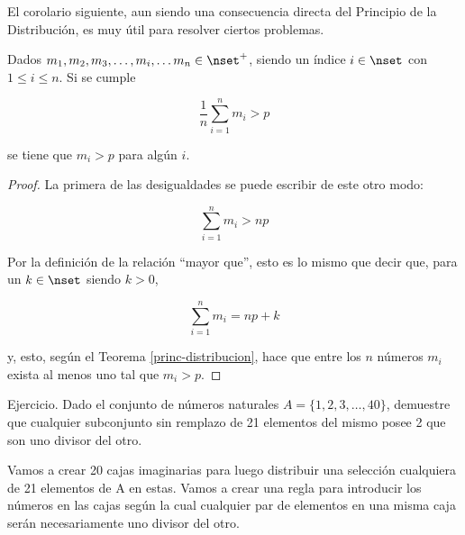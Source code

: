 \iffalse
Forma alternativa de enunciarlo.

\begin{theorem}[Principio de la Distribución]\label{princ-distribucion}
  Dados $c, e \in \nset^{+}$ con $c \nmid e$. Para cualquier distribución de
  $e$ elementos en $c$ conjuntos se tendrá algún conjunto con mínimo un
  elemento más que el cociente de la división de $e$ entre $c$.
\end{theorem}

Sería parecido a lo que se explica en el Teorema de la División Entera con
Resto solo que el cociente y el resto no están tan restringidos aquí.
\fi

El corolario siguiente, aun siendo una consecuencia directa del Principio de
la Distribución, es muy útil para resolver ciertos problemas.

\begin{corollary}
  Dados $m_1, m_2, m_3, \ldots, m_i, \ldots m_n \in \nset^{+}$, siendo un
  índice $i \in \nset$ con $1 \leq i \leq n$. Si se cumple

  $$ \frac{1}{n} \sum_{i=1}^n m_i > p $$

  \noindent se tiene que $m_i > p$ para algún $i$.
\end{corollary}

\begin{proof}
  La primera de las desigualdades se puede escribir de este otro modo:

  $$ \sum_{i=1}^n m_i > np $$

  \noindent Por la definición de la relación ``mayor que'', esto es lo mismo
  que decir que, para un $k \in \nset$ siendo $k > 0$,

  $$ \sum_{i=1}^n m_i = np + k $$

  \noindent y, esto, según el Teorema \ref{princ-distribucion}, hace que
  entre los $n$ números $m_i$ exista al menos uno tal que $m_i > p$.
\end{proof}

Ejercicio. Dado el conjunto de números naturales $A = \{1, 2, 3, \ldots,
40\}$, demuestre que cualquier subconjunto sin remplazo de 21 elementos del
mismo posee 2 que son uno divisor del otro.

Vamos a crear 20 cajas imaginarias para luego distribuir una selección
cualquiera de 21 elementos de A en estas. Vamos a crear una regla para
introducir los números en las cajas según la cual cualquier par de elementos
en una misma caja serán necesariamente uno divisor del otro.

